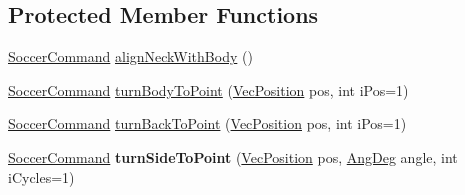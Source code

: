 \subsection*{Protected Member Functions}
\begin{DoxyCompactItemize}
\item 
\hyperlink{classSoccerCommand}{Soccer\+Command} \hyperlink{classBasicPlayer_a8110d9253af12626e3a404cfe476bed0}{align\+Neck\+With\+Body} ()
\item 
\hyperlink{classSoccerCommand}{Soccer\+Command} \hyperlink{classBasicPlayer_a4f4762b6f8a9938bd5142bee0865a72e}{turn\+Body\+To\+Point} (\hyperlink{classVecPosition}{Vec\+Position} pos, int i\+Pos=1)
\item 
\hyperlink{classSoccerCommand}{Soccer\+Command} \hyperlink{classBasicPlayer_acb667ad61ced5f4fea1b6552d7a218ca}{turn\+Back\+To\+Point} (\hyperlink{classVecPosition}{Vec\+Position} pos, int i\+Pos=1)
\item 
\hyperlink{classSoccerCommand}{Soccer\+Command} {\bfseries turn\+Side\+To\+Point} (\hyperlink{classVecPosition}{Vec\+Position} pos, \hyperlink{Geometry_8h_a6bfe02ae9bb185092902092561ab2865}{Ang\+Deg} angle, int i\+Cycles=1)\hypertarget{classBasicPlayer_abdeb44dc297eae5ea895a3adc1f40c44}{}\label{classBasicPlayer_abdeb44dc297eae5ea895a3adc1f40c44}


\end{DoxyCompactItemize}
